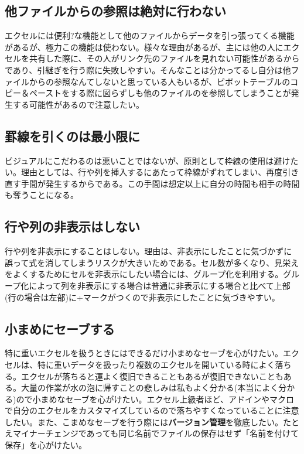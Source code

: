 \documentclass[dvipdfmx]{jsarticle}
\begin{document}
\subsection{他ファイルからの参照は絶対に行わない}
エクセルには便利?な機能として他のファイルからデータを引っ張ってくる機能があるが、極力この機能は使わない。様々な理由があるが、主には他の人にエクセルを共有した際に、その人がリンク先のファイルを見れない可能性があるからであり、引継ぎを行う際に失敗しやすい。そんなことは分かってるし自分は他ファイルからの参照なんてしないと思っている人もいるが、ピボットテーブルのコピー＆ペーストをする際に図らずしも他のファイルのを参照してしまうことが発生する可能性があるので注意したい。

\subsection{罫線を引くのは最小限に}
ビジュアルにこだわるのは悪いことではないが、原則として枠線の使用は避けたい。理由としては、行や列を挿入するにあたって枠線がずれてしまい、再度引き直す手間が発生するからである。この手間は想定以上に自分の時間も相手の時間も奪うことになる。

\subsection{行や列の非表示はしない}
行や列を非表示にすることはしない。理由は、非表示にしたことに気づかずに誤って式を消してしまうリスクが大きいためである。セル数が多くなり、見栄えをよくするためにセルを非表示にしたい場合には、グループ化を利用する。グループ化によって列を非表示にする場合は普通に非表示にする場合と比べて上部(行の場合は左部)に+マークがつくので非表示にしたことに気づきやすい。

\subsection{小まめにセーブする}
特に重いエクセルを扱うときにはできるだけ小まめなセーブを心がけたい。エクセルは、特に重いデータを扱ったり複数のエクセルを開いている時によく落ちる。エクセルが落ちると運よく復旧できることもあるが復旧できないこともある。大量の作業が水の泡に帰すことの悲しみは私もよく分かる(本当によく分かる)ので小まめなセーブを心がけたい。エクセル上級者ほど、アドインやマクロで自分のエクセルをカスタマイズしているので落ちやすくなっていることに注意したい。また、こまめなセーブを行う際には\textbf{バージョン管理}を徹底したい。たとえマイナーチェンジであっても同じ名前でファイルの保存はせず「名前を付けて保存」を心がけたい。
\end{document}
